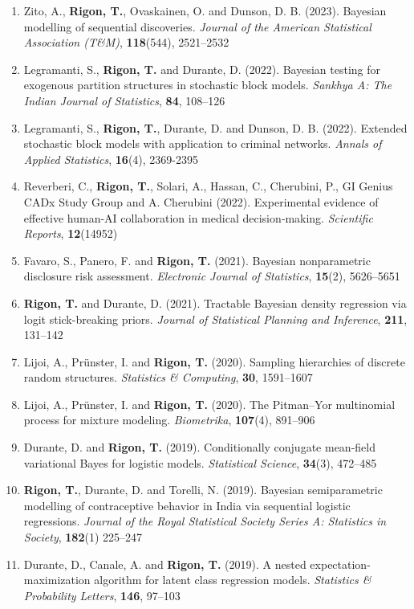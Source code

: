 \documentclass[10pt]{article}
\begin{document}
\begin{enumerate}
\item Zito, A., \textbf{Rigon, T.}, Ovaskainen, O. and Dunson, D. B. (2023). Bayesian modelling of sequential discoveries. \textit{Journal of the American Statistical Association (T\&M)}, \textbf{118}(544), 2521--2532

\item Legramanti, S., \textbf{Rigon, T.} and Durante, D. (2022). Bayesian testing for exogenous partition structures in stochastic block models. \textit{Sankhya A: The Indian Journal of Statistics}, \textbf{84}, 108--126

\item Legramanti, S., \textbf{Rigon, T.}, Durante, D. and Dunson, D. B. (2022). Extended stochastic block models with application to criminal networks. \textit{Annals of Applied Statistics}, \textbf{16}(4), 2369-2395

\item Reverberi, C., \textbf{Rigon, T.}, Solari, A., Hassan, C., Cherubini, P., GI Genius CADx Study Group and A. Cherubini (2022). Experimental evidence of effective human-AI collaboration in medical decision‐making. \textit{Scientific Reports}, \textbf{12}(14952)

\item Favaro, S., Panero, F. and \textbf{Rigon, T.} (2021). Bayesian nonparametric disclosure risk assessment. \textit{Electronic Journal of Statistics}, \textbf{15}(2), 5626--5651

\item \textbf{Rigon, T.} and Durante, D. (2021). Tractable Bayesian density regression via logit stick-breaking priors. \textit{Journal of Statistical Planning and Inference}, \textbf{211}, 131--142

\item Lijoi, A., Pr\"unster, I. and \textbf{Rigon, T.} (2020). Sampling hierarchies of discrete random structures. \textit{Statistics \& Computing}, \textbf{30}, 1591--1607

\item Lijoi, A., Pr\"unster, I. and \textbf{Rigon, T.} (2020). The Pitman--Yor multinomial process for mixture modeling. \textit{Biometrika}, \textbf{107}(4), 891--906

\item Durante, D. and \textbf{Rigon, T.} (2019). Conditionally conjugate mean-field variational Bayes for logistic models. \textit{Statistical Science}, \textbf{34}(3), 472--485

\item \textbf{Rigon, T.}, Durante, D. and Torelli, N. (2019). Bayesian semiparametric modelling of contraceptive behavior in India via sequential logistic regressions. \textit{Journal of the Royal Statistical Society Series A: Statistics in Society}, \textbf{182}(1) 225--247

\item Durante, D., Canale, A. and \textbf{Rigon, T.} (2019). A nested expectation-maximization algorithm for latent class regression models. \textit{Statistics \& Probability Letters}, \textbf{146}, 97--103
\setcounter{publications}{\value{enumi}}
\end{enumerate}
\end{document}
